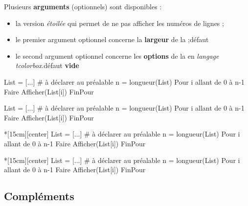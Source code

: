 \documentclass[a4paper,french,11pt]{article}
\newcommand\ctex[1]{\tcbox[vignettelatex]{#1}}
\newcommand\Cle[1]{{\bfseries\sffamily\textlangle #1\textrangle}}
\begin{document}
\begin{codecles}
Plusieurs \Cle{arguments} (optionnels) sont disponibles :

\begin{itemize}
	\item la version \textit{étoilée} qui permet de ne pas afficher les numéros de lignes ;
	\item le premier argument optionnel concerne la \Cle{largeur} de la \ctex{tcbox} ;\hfill{}défaut \Cle{12cm}
	\item le second argument optionnel concerne les \Cle{options} de la \ctex{tcbox} en \textit{langage tcolorbox}.\hfill{}défaut \Cle{vide}
\end{itemize}
\end{codecles}

\begin{codetex}
\begin{PseudoCode} %
List = [...]          # à déclarer au préalable
n = longueur(List)
Pour i allant de 0 à n-1 Faire
	Afficher(List[i])
FinPour
\end{PseudoCode}
\end{codetex}

\begin{codesortie}
\begin{PseudoCode}
List = [...]          # à déclarer au préalable
n = longueur(List)
Pour i allant de 0 à n-1 Faire
	Afficher(List[i])
FinPour
\end{PseudoCode}
\end{codesortie}

\begin{codetex}
\begin{PseudoCode}*[15cm][center] %
List = [...]          # à déclarer au préalable
n = longueur(List)
Pour i allant de 0 à n-1 Faire
	Afficher(List[i])
FinPour
\end{PseudoCode}
\end{codetex}

\begin{codesortie}
\begin{PseudoCode}*[15cm][center]
List = [...]          # à déclarer au préalable
n = longueur(List)
Pour i allant de 0 à n-1 Faire
	Afficher(List[i])
FinPour
\end{PseudoCode}
\end{codesortie}

\subsection{Compléments}
\end{document}
